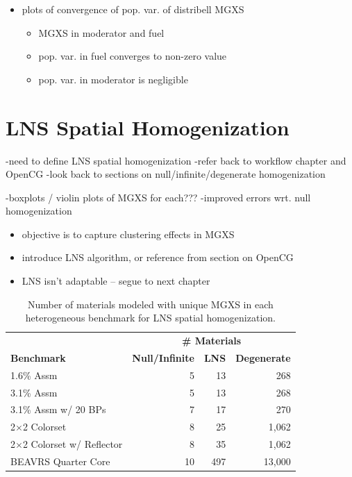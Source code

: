 \begin{itemize}[noitemsep]
  \item plots of convergence of pop. var. of distribell MGXS
  \begin{itemize}[noitemsep]
    \item MGXS in moderator and fuel
    \item pop. var. in fuel converges to non-zero value
    \item pop. var. in moderator is negligible
  \end{itemize}
\end{itemize}


\section{LNS Spatial Homogenization}
\label{sec:chap9-lns-homogenize}

-need to define \ac{LNS} spatial homogenization
-refer back to workflow chapter and OpenCG
-look back to sections on null/infinite/degenerate homogenization

-boxplots / violin plots of MGXS for each???
-improved errors wrt. null homogenization

\begin{itemize}[noitemsep]
  \item objective is to capture clustering effects in MGXS
  \item introduce LNS algorithm, or reference from section on OpenCG
  \item LNS isn't adaptable -- segue to next chapter
\end{itemize}

\begin{table}[h!]
  \centering
  \caption[Number of materials for LNS spatial homogenization]{Number of materials modeled with unique \ac{MGXS} in each heterogeneous benchmark for \ac{LNS} spatial homogenization.}
  \small
  \label{table:chap9-num-materials-lns}
  \vspace{6pt}
  \begin{tabular}{l r r r}
  \toprule
  \rowcolor{lightgray}
  & \multicolumn{3}{c}{\cellcolor{lightgray} \bf \# Materials} \\
  \multirow{-2}{*}{\cellcolor{lightgray} \bf Benchmark} &
  \multicolumn{1}{c}{\cellcolor{lightgray} \bf Null/Infinite} &
  \multicolumn{1}{c}{\cellcolor{lightgray} \bf \ac{LNS}} &
  \multicolumn{1}{c}{\cellcolor{lightgray} \bf Degenerate} \\
  \midrule
1.6\% Assm & 5 & 13 & 268 \\
  \midrule
3.1\% Assm & 5 & 13 & 268 \\
  \midrule
3.1\% Assm w/ 20 BPs & 7 & 17 & 270  \\
  \midrule
2$\times$2 Colorset & 8 & 25 & 1,062 \\
  \midrule
2$\times$2 Colorset w/ Reflector & 8 & 35 & 1,062 \\
  \midrule
\ac{BEAVRS} Quarter Core & 10 & 497 & 13,000 \\ %
  \bottomrule
\end{tabular}
\end{table}


